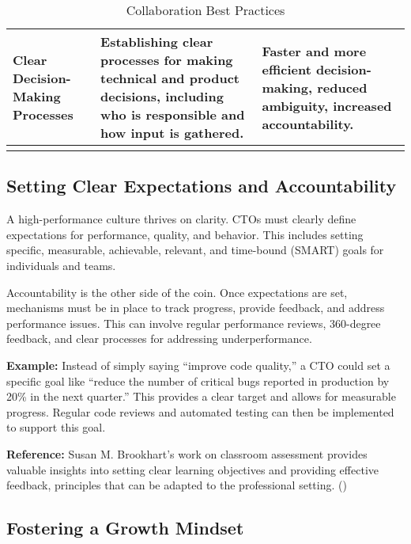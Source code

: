 \begin{longtable}{|p{4cm}|p{5cm}|p{4cm}|}
    \hline
    Clear Decision-Making Processes & Establishing clear processes for making technical and product decisions, including who is responsible and how input is gathered. & Faster and more efficient decision-making, reduced ambiguity, increased accountability.                    \\
    \hline
    \caption{Collaboration Best Practices}
    \label{tab:collaboration_best_practices}                                                                                                                                                                                                                                        \\
\end{longtable}

\subsection{Setting Clear Expectations and Accountability}

A high-performance culture thrives on clarity. CTOs must clearly define expectations for performance, quality, and behavior. This includes setting specific, measurable, achievable, relevant, and time-bound (SMART) goals for individuals and teams.

Accountability is the other side of the coin. Once expectations are set, mechanisms must be in place to track progress, provide feedback, and address performance issues. This can involve regular performance reviews, 360-degree feedback, and clear processes for addressing underperformance.

\textbf{Example:} Instead of simply saying ``improve code quality,'' a CTO could set a specific goal like ``reduce the number of critical bugs reported in production by 20\% in the next quarter.'' This provides a clear target and allows for measurable progress. Regular code reviews and automated testing can then be implemented to support this goal.

\textbf{Reference:} Susan M. Brookhart's work on classroom assessment provides valuable insights into setting clear learning objectives and providing effective feedback, principles that can be adapted to the professional setting. (\cite{brookhart2017})

\subsection{Fostering a Growth Mindset}

